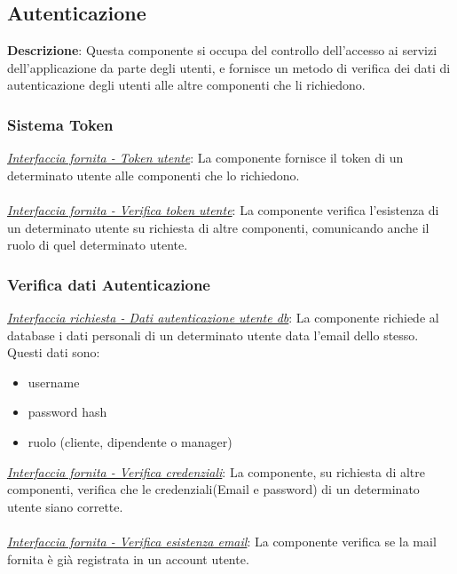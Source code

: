 \documentclass{report}
\begin{document}
\subsection*{Autenticazione}
\textbf{Descrizione}: Questa componente si occupa del controllo dell'accesso ai servizi dell'applicazione da parte degli utenti,
e fornisce un metodo di verifica dei dati di autenticazione degli utenti alle altre componenti che li richiedono.
\subsubsection*{\indent  \indent Sistema Token}
\uline{\textit{Interfaccia fornita - Token utente}}: 
La componente fornisce il token di un determinato utente alle componenti che lo richiedono.\\ \\ 
\uline{\textit{Interfaccia fornita - Verifica token utente}}: 
La componente verifica l'esistenza di un determinato utente su richiesta di altre componenti, comunicando anche il ruolo di quel determinato utente.

\subsubsection*{\indent \indent Verifica dati Autenticazione}
\uline{\textit{Interfaccia richiesta - Dati autenticazione utente db}}: 
La componente richiede al database i dati personali di un determinato utente data l'email dello stesso. Questi dati sono:
\begin{itemize}
	\item username
	\item password hash
	\item ruolo (cliente, dipendente o manager)
\end{itemize}
\uline{\textit{Interfaccia fornita - Verifica credenziali}}: 
La componente, su richiesta di altre componenti, verifica che le credenziali(Email e password) di un determinato utente siano corrette.\\ \\ 
\uline{\textit{Interfaccia fornita - Verifica esistenza email}}: 
La componente verifica se la mail fornita è già registrata in un account utente.
\end{document}
